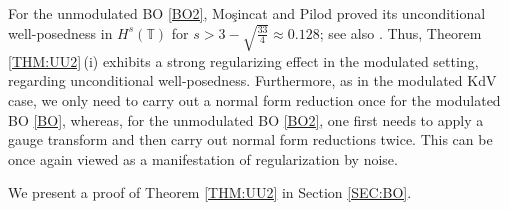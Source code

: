 \documentclass[letterpaper, 11pt,  reqno]{amsart}
\newcommand{\1}{\hspace{0.5mm}\text{I}\hspace{0.5mm}}
\newcommand{\T}{\mathbb{T}}
\numberwithin{equation}{section}
\numberwithin{theorem}{section}
\begin{document}
%



For the unmodulated BO \eqref{BO2}, 
Mo\c{s}incat and Pilod
proved
its unconditional well-posedness
in $H^s(\T)$ for $s >  3 - \sqrt{\frac {33}4} \approx 0.128$;
see also \cite{Ki3}.
Thus, Theorem \ref{THM:UU2}\,(i)
exhibits a strong regularizing effect in the modulated setting, 
regarding  unconditional well-posedness.
Furthermore, as in the modulated KdV case, 
we only need to carry out a normal form reduction
once for the modulated BO \eqref{BO}, whereas, for the unmodulated BO \eqref{BO2}, 
one first needs to apply a gauge transform 
and then carry out normal form reductions twice.
This  can be once again viewed as a manifestation
of regularization by noise.



We present a proof of Theorem \ref{THM:UU2}
in Section \ref{SEC:BO}.
\end{document}
